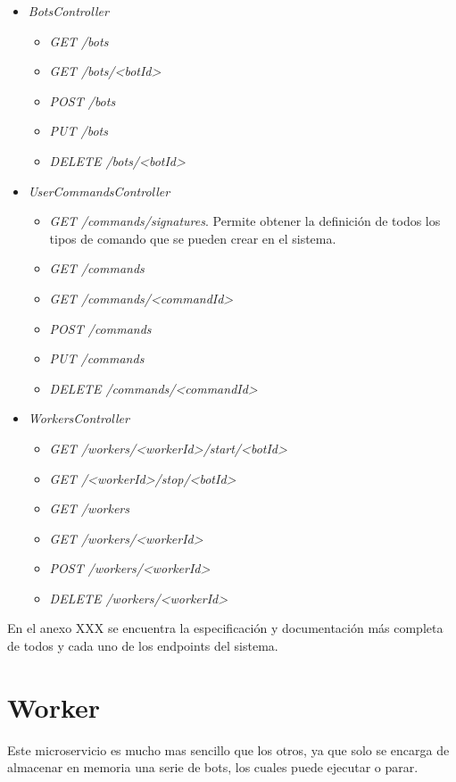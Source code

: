 \begin{itemize}
	\item \textit{BotsController}
	\begin{itemize}
		\item \textit{GET /bots}
		\item \textit{GET /bots/<botId>}
		\item \textit{POST /bots}
		\item \textit{PUT /bots}
		\item \textit{DELETE /bots/<botId>}
	\end{itemize}
	\item \textit{UserCommandsController}
	\begin{itemize}
		\item \textit{GET /commands/signatures}. Permite obtener la definición de todos los tipos de comando que se pueden crear en el sistema.
		\item \textit{GET /commands}
		\item \textit{GET /commands/<commandId>}
		\item \textit{POST /commands}
		\item \textit{PUT /commands}
		\item \textit{DELETE /commands/<commandId>}
	\end{itemize}
	\item \textit{WorkersController}
	\begin{itemize}
		\item \textit{GET /workers/<workerId>/start/<botId>}
		\item \textit{GET /<workerId>/stop/<botId>}
		\item \textit{GET /workers}
		\item \textit{GET /workers/<workerId>}
		\item \textit{POST /workers/<workerId>}
		\item \textit{DELETE /workers/<workerId>}
	\end{itemize}
\end{itemize}

En el anexo XXX se encuentra la especificación y documentación más completa de todos y cada uno de los endpoints del sistema.






\section{Worker}

Este microservicio es mucho mas sencillo que los otros, ya que solo se encarga de almacenar en memoria una serie de bots, los cuales puede ejecutar o parar.

